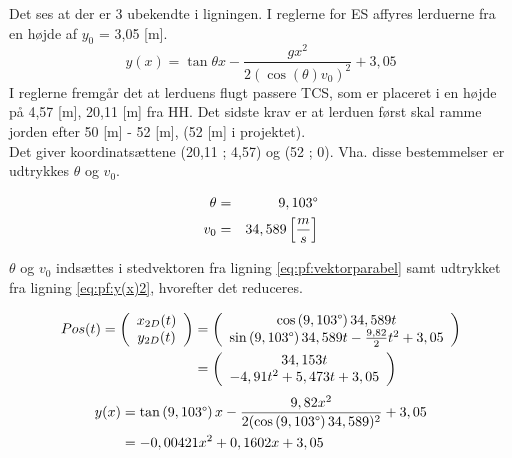 Det ses at der er 3 ubekendte i ligningen. I reglerne for ES affyres lerduerne fra en højde af \(y_0\) = 3,05 [m].
\begin{equation}
y(x) = \tan \theta x - \frac{gx^2}{2(\cos \left( \theta \right)  v_0)^2} + 3,05
\label{eq:pf:y(x)2}
\end{equation}
I reglerne fremgår det at lerduens flugt passere TCS, som er placeret i en højde på 4,57 [m], 20,11 [m] fra HH. Det sidste krav er at lerduen først skal ramme jorden efter 50 [m] - 52 [m], (52 [m] i projektet). \\
Det giver koordinatsættene (20,11 ; 4,57) og (52 ; 0). Vha. disse bestemmelser er udtrykkes \(\theta\) og \(v_0\).

\begin{eqnarray}
\theta &=& 9,103 \degree \\
v_0 &=& 34,589 \left[ \frac { m }{ s }  \right] 
\end{eqnarray}

 \(\theta\) og \(v_0\) indsættes i stedvektoren fra ligning \ref{eq:pf:vektorparabel} samt udtrykket fra ligning \ref{eq:pf:y(x)2}, hvorefter det reduceres.

\begin{align}
\begin{split}
	Pos(t) = \left( \begin{array}{c}
	x_{2D}(t) \\
	y_{2D}(t)
	\end{array}
	\right)
	&= \left( \begin{array}{c}
	\cos \left(9,103 \degree \right) 34,589 t \\
	\sin \left(9,103 \degree \right) 34,589 t - \frac{9,82}{2} t^2 + 3,05
	\end{array}
	\right) \\
	&= \left( \begin{array}{c}
	34,153 t \\
	- 4,91 t^2 + 5,473 t + 3,05
	\end{array}
	\right)
\label{eq:pf:vektorparabel2}
\end{split}
\end{align}
\begin{align}
\begin{split}
y(x) &= \tan \left(9,103 \degree \right) x - \frac{9,82x^2}{2(\cos \left(9,103 \degree \right) 34,589)^2} + 3,05 \\
&= - 0,00421 x^2 + 0,1602 x  + 3,05
\label{eq:pf:y(x)3}
\end{split}
\end{align}


